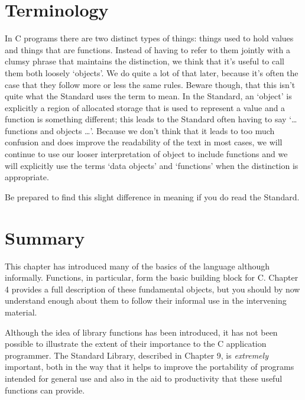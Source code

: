  
        \section{Terminology}
        

  

  In C programs there are two distinct types of things: things used to hold
   values and things that are functions. Instead of having to refer to them
   jointly with a clumsy phrase that maintains the distinction, we think that
   it's useful to call them both loosely `objects'. We do quite a lot of
   that later, because it's often the case that they follow more or less the
   same rules. Beware though, that this isn't quite what the Standard uses the
   term to mean. In the Standard, an `object' is explicitly a region of
   allocated storage that is used to represent a value and a function is
   something different; this leads to the Standard often having to say
   `\ldots  functions and objects \ldots '. Because we don't think
   that it leads to too much confusion and does improve the readability of the
   text in most cases, we will continue to use our looser interpretation of
   object to include functions and we will explicitly use the terms `data
   objects' and `functions' when the distinction is appropriate.


  Be prepared to find this slight difference in meaning if you do read the
   Standard.


 
        \section{Summary}
        


  This chapter has introduced many of the basics of the language although
   informally. Functions, in particular, form the basic building block for C.
   Chapter 4 provides a full description of these fundamental
   objects, but you should by now understand enough about them to follow their
   informal use in the intervening material.


  Although the idea of library functions has been introduced, it has not
   been possible to illustrate the extent of their importance to the C
   application programmer. The Standard Library, described in Chapter 9, is \textit{extremely} important, both in the way that it helps to
   improve the portability of programs intended for general use and also in
   the aid to productivity that these useful functions can provide.


